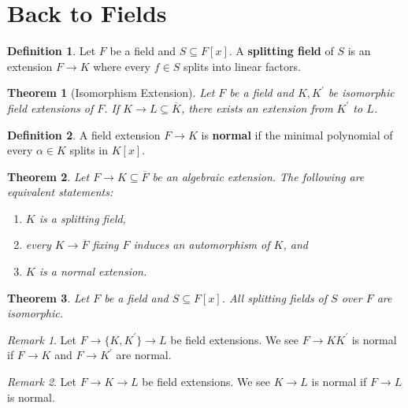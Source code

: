 \documentclass[
    parskip=half,
    toc=flat,
    toc=sectionentrydotfill,
]{scrartcl}  %
\theoremstyle{definition}
\newtheorem{definition}{Definition}[section]
\theoremstyle{plain}
\newtheorem{theorem}{Theorem}[section]
\theoremstyle{remark}
\newtheorem{remark}{Remark}[section]
\begin{document}
\section{Back to Fields}

\begin{definition}
    Let $F$ be a field and $S\subseteq F[x]$.
    A \textbf{splitting field} of $S$ is an extension $F\to K$ where every $f\in S$ splits into
    linear factors.
\end{definition}

\begin{theorem}[Isomorphism Extension]
    Let $F$ be a field and $K,K^\prime$ be isomorphic field extensions of $F$.
    If $K\to L\subseteq\overline{K}$, there exists an extension from $K^\prime$ to $L$.
\end{theorem}

\begin{definition}
    A field extension $F\to K$ is \textbf{normal} if the minimal polynomial of every $\alpha\in K$
    splits in $K[x]$.
\end{definition}

\begin{theorem}
    Let $F\to K\subseteq\overline{F}$ be an algebraic extension.
    The following are equivalent statements:
    \begin{enumerate}
        \item $K$ is a splitting field,
        \item every $K\to\overline{F}$ fixing $F$ induces an automorphism of $K$, and
        \item $K$ is a normal extension.
    \end{enumerate}
\end{theorem}

\begin{theorem}
    Let $F$ be a field and $S\subseteq F[x]$.
    All splitting fields of $S$ over $F$ are isomorphic.
\end{theorem}

\begin{remark}
    Let $F\to\{K,K^\prime\}\to L$ be field extensions.
    We see $F\to KK^\prime$ is normal if $F\to K$ and $F\to K^\prime$ are normal.
\end{remark}

\begin{remark}
    Let $F\to K\to L$ be field extensions.
    We see $K\to L$ is normal if $F\to L$ is normal.
\end{remark}
\end{document}
